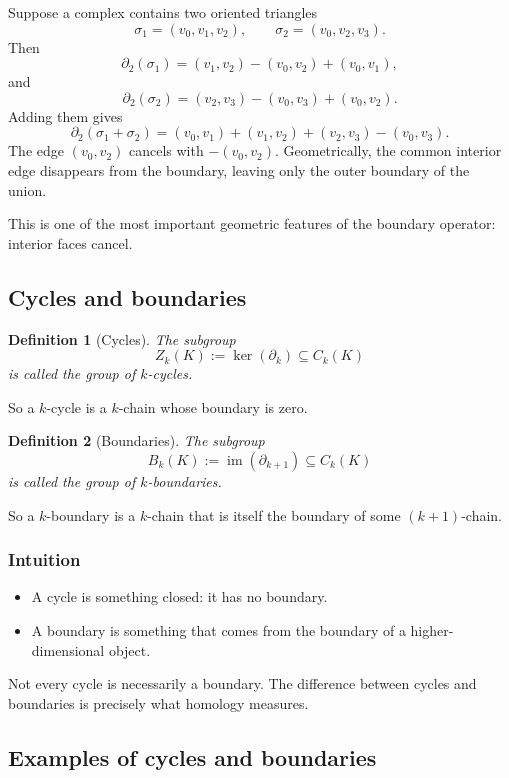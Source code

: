 \documentclass[12pt,a4paper]{article}
\newtheorem{definition}{Definition}[section]
\theoremstyle{notespace}
\begin{document}
Suppose a complex contains two oriented triangles
\[
\sigma_1=(v_0,v_1,v_2),
\qquad
\sigma_2=(v_0,v_2,v_3).
\]
Then
\[
\partial_2(\sigma_1)
=
(v_1,v_2)-(v_0,v_2)+(v_0,v_1),
\]
and
\[
\partial_2(\sigma_2)
=
(v_2,v_3)-(v_0,v_3)+(v_0,v_2).
\]
Adding them gives
\[
\partial_2(\sigma_1+\sigma_2)
=
(v_0,v_1)+(v_1,v_2)+(v_2,v_3)-(v_0,v_3).
\]
The edge \((v_0,v_2)\) cancels with \(-(v_0,v_2)\). Geometrically, the common interior edge disappears from the boundary, leaving only the outer boundary of the union.

This is one of the most important geometric features of the boundary operator: interior faces cancel.

\subsection{Cycles and boundaries}

\begin{definition}[Cycles]
	The subgroup
	\[
	Z_k(K):=\ker(\partial_k)\subseteq C_k(K)
	\]
	is called the group of \emph{\(k\)-cycles}.
\end{definition}

So a \(k\)-cycle is a \(k\)-chain whose boundary is zero.

\begin{definition}[Boundaries]
	The subgroup
	\[
	B_k(K):=\operatorname{im}(\partial_{k+1})\subseteq C_k(K)
	\]
	is called the group of \emph{\(k\)-boundaries}.
\end{definition}

So a \(k\)-boundary is a \(k\)-chain that is itself the boundary of some \((k+1)\)-chain.

\subsubsection*{Intuition}

\begin{itemize}
	\item A cycle is something closed: it has no boundary.
	\item A boundary is something that comes from the boundary of a higher-dimensional object.
\end{itemize}

Not every cycle is necessarily a boundary. The difference between cycles and boundaries is precisely what homology measures.

\subsection{Examples of cycles and boundaries}
\end{document}
